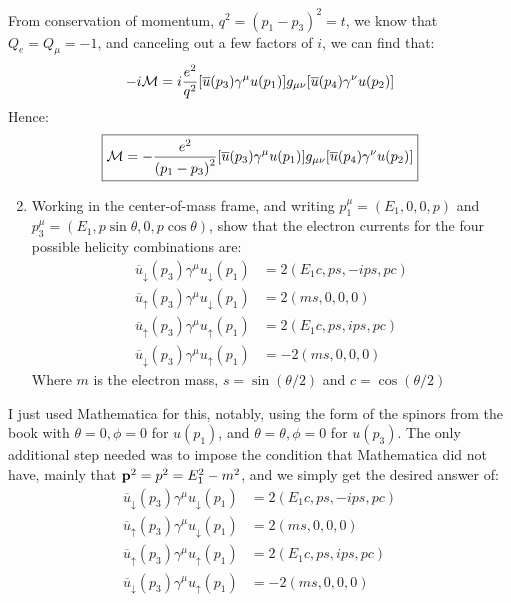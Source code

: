 \documentclass[12pt]{article}
\renewcommand{\bar}{\overline}
\newcommand{\M}{\mathcal{M}}
\begin{document}
From conservation of momentum, $q^2={(p_1-p_3)}^2=t$, we know that $Q_e=Q_\mu=-1$, and canceling out a few factors of $i$, we can find that:
\begin{align*}
  -i\M=i\frac{e^2}{q^2}\qty[\bar{u}(p_3)\gamma^\mu u(p_1)]
  g_{\mu\nu}
  \qty[\bar{u}(p_4)\gamma^\nu u(p_2)]
\end{align*}
Hence:
\begin{equation}
  \label{eq:p3a}
  \boxed{\M=-\frac{e^2}{{(p_1-p_3)}^2}\qty[\bar{u}(p_3)\gamma^\mu u(p_1)]
  g_{\mu\nu}\qty[\bar{u}(p_4)\gamma^\nu u(p_2)]}
\end{equation}
\begin{problem}
  \begin{enumerate}[label = (\alph*)]
    \setcounter{enumi}{1}
  \item Working in the center-of-mass frame, and writing $p^\mu_1=(E_1,0,0,p)$ and $p^\mu_3=(E_1,p\sin\theta,0,p\cos\theta)$, show that the electron currents for the four possible helicity combinations are:
    \begin{align*}
      \bar{u}_\downarrow(p_3)\gamma^\mu u_\downarrow(p_1)&=2(E_1c,ps,-ips,pc)\\
      \bar{u}_\uparrow(p_3)\gamma^\mu u_\downarrow(p_1)&=2(ms,0,0,0)\\
      \bar{u}_\uparrow(p_3)\gamma^\mu u_\uparrow(p_1)&=2(E_1c,ps,ips,pc)\\
      \bar{u}_\downarrow(p_3)\gamma^\mu u_\uparrow(p_1)&=-2(ms,0,0,0)
    \end{align*}
    Where $m$ is the electron mass, $s=\sin(\theta/2)$ and $c=\cos(\theta/2)$
  \end{enumerate}
\end{problem}
I just used Mathematica for this, notably, using the form of the spinors from the book with $\theta=0,\phi=0$ for $u(p_1)$, and $\theta=\theta,\phi=0$ for $u(p_3)$. The only additional step needed was to impose the condition that Mathematica did not have, mainly that $\vb{p}^2=p^2=E_1^2-m^2$, and we simply get the desired answer of:
\begin{equation}
  \label{eq:p3b}
  \boxed{
    \begin{aligned}
      \bar{u}_\downarrow(p_3)\gamma^\mu u_\downarrow(p_1)&=2(E_1c,ps,-ips,pc)\\
      \bar{u}_\uparrow(p_3)\gamma^\mu u_\downarrow(p_1)&=2(ms,0,0,0)\\
      \bar{u}_\uparrow(p_3)\gamma^\mu u_\uparrow(p_1)&=2(E_1c,ps,ips,pc)\\
      \bar{u}_\downarrow(p_3)\gamma^\mu u_\uparrow(p_1)&=-2(ms,0,0,0)
    \end{aligned}
  }
\end{equation}
\end{document}
